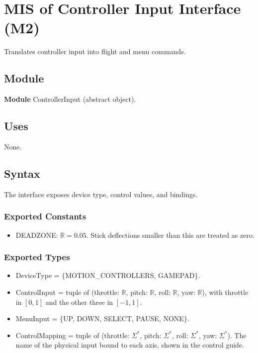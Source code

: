 \documentclass[12pt, titlepage]{article}
\begin{document}
\newpage
\section{MIS of Controller Input Interface (M2)} \label{sec:M2}

Translates controller input into flight and menu commands.

\subsection{Module}

\textbf{Module} ControllerInput (abstract object).

\subsection{Uses}

None.

\subsection{Syntax}

The interface exposes device type, control values, and bindings.

\subsubsection{Exported Constants}

\begin{itemize}
\item DEADZONE: $\mathbb{R} = 0.05$. Stick deflections smaller than this are
  treated as zero.
\end{itemize}

\subsubsection{Exported Types}

\begin{itemize}
\item DeviceType = $\{$MOTION\_CONTROLLERS, GAMEPAD$\}$.
\item ControlInput = tuple of (throttle: $\mathbb{R}$, pitch: $\mathbb{R}$,
  roll: $\mathbb{R}$, yaw: $\mathbb{R}$), with throttle in $[0, 1]$ and the
  other three in $[-1, 1]$.
\item MenuInput = $\{$UP, DOWN, SELECT, PAUSE, NONE$\}$.
\item ControlMapping = tuple of (throttle: $\Sigma^*$, pitch: $\Sigma^*$, roll:
  $\Sigma^*$, yaw: $\Sigma^*$). The name of the physical input bound to each
  axis, shown in the control guide.
\end{itemize}
\end{document}
